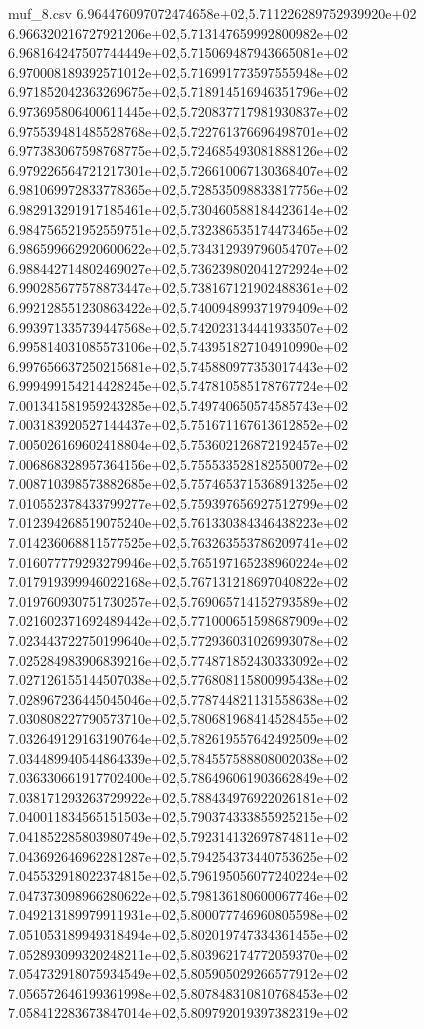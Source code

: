 \begin{filecontents*}{muf_8.csv}
6.964476097072474658e+02,5.711226289752939920e+02
6.966320216727921206e+02,5.713147659992800982e+02
6.968164247507744449e+02,5.715069487943665081e+02
6.970008189392571012e+02,5.716991773597555948e+02
6.971852042363269675e+02,5.718914516946351796e+02
6.973695806400611445e+02,5.720837717981930837e+02
6.975539481485528768e+02,5.722761376696498701e+02
6.977383067598768775e+02,5.724685493081888126e+02
6.979226564721217301e+02,5.726610067130368407e+02
6.981069972833778365e+02,5.728535098833817756e+02
6.982913291917185461e+02,5.730460588184423614e+02
6.984756521952559751e+02,5.732386535174473465e+02
6.986599662920600622e+02,5.734312939796054707e+02
6.988442714802469027e+02,5.736239802041272924e+02
6.990285677578873447e+02,5.738167121902488361e+02
6.992128551230863422e+02,5.740094899371979409e+02
6.993971335739447568e+02,5.742023134441933507e+02
6.995814031085573106e+02,5.743951827104910990e+02
6.997656637250215681e+02,5.745880977353017443e+02
6.999499154214428245e+02,5.747810585178767724e+02
7.001341581959243285e+02,5.749740650574585743e+02
7.003183920527144437e+02,5.751671167613612852e+02
7.005026169602418804e+02,5.753602126872192457e+02
7.006868328957364156e+02,5.755533528182550072e+02
7.008710398573882685e+02,5.757465371536891325e+02
7.010552378433799277e+02,5.759397656927512799e+02
7.012394268519075240e+02,5.761330384346438223e+02
7.014236068811577525e+02,5.763263553786209741e+02
7.016077779293279946e+02,5.765197165238960224e+02
7.017919399946022168e+02,5.767131218697040822e+02
7.019760930751730257e+02,5.769065714152793589e+02
7.021602371692489442e+02,5.771000651598687909e+02
7.023443722750199640e+02,5.772936031026993078e+02
7.025284983906839216e+02,5.774871852430333092e+02
7.027126155144507038e+02,5.776808115800995438e+02
7.028967236445045046e+02,5.778744821131558638e+02
7.030808227790573710e+02,5.780681968414528455e+02
7.032649129163190764e+02,5.782619557642492509e+02
7.034489940544864339e+02,5.784557588808002038e+02
7.036330661917702400e+02,5.786496061903662849e+02
7.038171293263729922e+02,5.788434976922026181e+02
7.040011834565151503e+02,5.790374333855925215e+02
7.041852285803980749e+02,5.792314132697874811e+02
7.043692646962281287e+02,5.794254373440753625e+02
7.045532918022374815e+02,5.796195056077240224e+02
7.047373098966280622e+02,5.798136180600067746e+02
7.049213189979911931e+02,5.800077746960805598e+02
7.051053189949318494e+02,5.802019747334361455e+02
7.052893099320248211e+02,5.803962174772059370e+02
7.054732918075934549e+02,5.805905029266577912e+02
7.056572646199361998e+02,5.807848310810768453e+02
7.058412283673847014e+02,5.809792019397382319e+02

\end{filecontents*}
